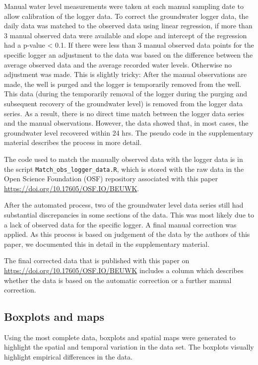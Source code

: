 \documentclass[, manuscript]{copernicus}
\begin{document}
Manual water level measurements were taken at each manual sampling date
to allow calibration of the logger data. To correct the groundwater
logger data, the daily data was matched to the observed data using
linear regression, if more than 3 manual observed data were available
and slope and intercept of the regression had a p-value \textless{} 0.1.
If there were less than 3 manual observed data points for the specific
logger an adjustment to the data was based on the difference between the
average observed data and the average recorded water levels. Otherwise
no adjustment was made. This is slightly tricky: After the manual
observations are made, the well is purged and the logger is temporarily
removed from the well. This data (during the temporarily removal of the
logger during the purging and subsequent recovery of the groundwater
level) is removed from the logger data series. As a result, there is no
direct time match between the logger data series and the manual
observations. However, the data showed that, in most cases, the
groundwater level recovered within 24 hrs. The pseudo code in the
supplementary material describes the process in more detail.

The code used to match the manually observed data with the logger data
is in the script \texttt{Match\_obs\_logger\_data.R}, which is stored
with the raw data in the Open Science Foundation (OSF) repository
associated with this paper \url{https://doi.org/10.17605/OSF.IO/BEUWK}.

After the automated process, two of the groundwater level data series
still had substantial discrepancies in some sections of the data. This
was most likely due to a lack of observed data for the specific logger.
A final manual correction was applied. As this process is based on
judgement of the data by the authors of this paper, we documented this
in detail in the supplementary material.

The final corrected data that is published with this paper on
\url{https://doi.org/10.17605/OSF.IO/BEUWK} includes a column which
describes whether the data is based on the automatic correction or a
further manual correction.

\clearpage

\subsection{Boxplots and maps}

Using the most complete data, boxplots and spatial maps were generated
to highlight the spatial and temporal variation in the data set. The
boxplots visually highlight empirical differences in the data.
\end{document}
